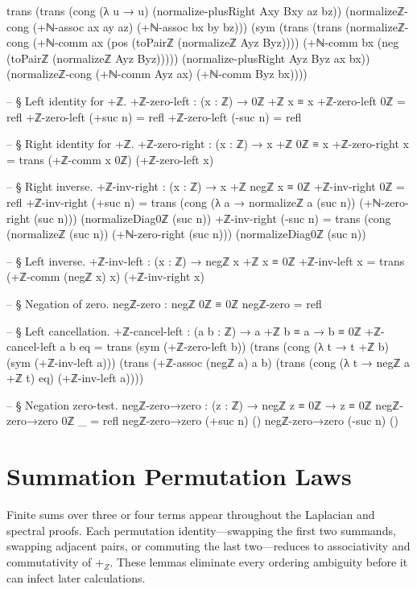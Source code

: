 \documentclass[11pt,a4paper]{book}
\def\mathbb#1{#1}%
\begin{document}
\begin{code}
  trans
    (trans
      (cong (λ u → u) (normalize-plusRight Axy Bxy az bz))
      (normalizeℤ-cong (+ℕ-assoc ax ay az) (+ℕ-assoc bx by bz)))
    (sym
      (trans
        (trans
          (normalizeℤ-cong (+ℕ-comm ax (pos (toPairℤ (normalizeℤ Ayz Byz))))
                           (+ℕ-comm bx (neg (toPairℤ (normalizeℤ Ayz Byz)))))
          (normalize-plusRight Ayz Byz ax bx))
        (normalizeℤ-cong (+ℕ-comm Ayz ax) (+ℕ-comm Byz bx))))

-- § Left identity for +ℤ.
+ℤ-zero-left : (x : ℤ) → 0ℤ +ℤ x ≡ x
+ℤ-zero-left 0ℤ = refl
+ℤ-zero-left (+suc n) = refl
+ℤ-zero-left (-suc n) = refl

-- § Right identity for +ℤ.
+ℤ-zero-right : (x : ℤ) → x +ℤ 0ℤ ≡ x
+ℤ-zero-right x = trans (+ℤ-comm x 0ℤ) (+ℤ-zero-left x)

-- § Right inverse.
+ℤ-inv-right : (x : ℤ) → x +ℤ negℤ x ≡ 0ℤ
+ℤ-inv-right 0ℤ = refl
+ℤ-inv-right (+suc n) =
  trans
    (cong (λ a → normalizeℤ a (suc n)) (+ℕ-zero-right (suc n)))
    (normalizeDiag0ℤ (suc n))
+ℤ-inv-right (-suc n) =
  trans
    (cong (normalizeℤ (suc n)) (+ℕ-zero-right (suc n)))
    (normalizeDiag0ℤ (suc n))

-- § Left inverse.
+ℤ-inv-left : (x : ℤ) → negℤ x +ℤ x ≡ 0ℤ
+ℤ-inv-left x = trans (+ℤ-comm (negℤ x) x) (+ℤ-inv-right x)

-- § Negation of zero.
negℤ-zero : negℤ 0ℤ ≡ 0ℤ
negℤ-zero = refl

-- § Left cancellation.
+ℤ-cancel-left : (a b : ℤ) → a +ℤ b ≡ a → b ≡ 0ℤ
+ℤ-cancel-left a b eq =
  trans
    (sym (+ℤ-zero-left b))
    (trans
      (cong (λ t → t +ℤ b) (sym (+ℤ-inv-left a)))
      (trans
        (+ℤ-assoc (negℤ a) a b)
        (trans
          (cong (λ t → negℤ a +ℤ t) eq)
          (+ℤ-inv-left a))))

-- § Negation zero-test.
negℤ-zero→zero : (z : ℤ) → negℤ z ≡ 0ℤ → z ≡ 0ℤ
negℤ-zero→zero 0ℤ _ = refl
negℤ-zero→zero (+suc n) ()
negℤ-zero→zero (-suc n) ()
\end{code}

\section{Summation Permutation Laws}

Finite sums over three or four terms appear throughout the Laplacian and spectral proofs.
Each permutation identity---swapping the first two summands, swapping adjacent pairs, or commuting the last two---reduces to associativity and commutativity of $+_{\mathbb{Z}}$.
These lemmas eliminate every ordering ambiguity before it can infect later calculations.
\end{document}
